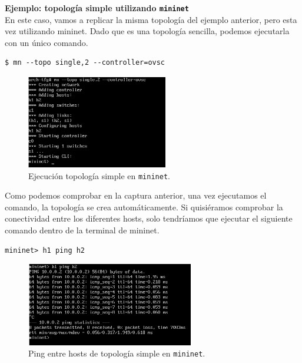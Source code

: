 \documentclass[12pt]{article}
\begin{document}
	\vspace{10px}
	
	\noindent \textbf{\large Ejemplo: topología simple utilizando \texttt{mininet}}\\
	
	\noindent En este caso, vamos a replicar la misma topología del ejemplo anterior, pero esta vez utilizando mininet. Dado que es una topología sencilla, podemos ejecutarla con un único comando. 
	
	\begin{verbatim}
$ mn --topo single,2 --controller=ovsc
	\end{verbatim}

	\begin{figure}[h!]
		\begin{center}
			\includegraphics[width=0.55\textwidth]{img/mn_single_1.png}
			\caption{Ejecución topología simple en \texttt{mininet}.}
		\end{center}
	\end{figure}

	\pagebreak
	
	\noindent Como podemos comprobar en la captura anterior, una vez ejecutamos el comando, la topología se crea automáticamente. Si quisiéramos comprobar la conectividad entre los diferentes hosts, solo tendríamos que ejecutar el siguiente comando dentro de la terminal de mininet.
	
	\begin{verbatim}
mininet> h1 ping h2
	\end{verbatim}

	\begin{figure}[h!]
		\begin{center}
			\includegraphics[width=0.65\textwidth]{img/mn_single_2.png}
			\caption{Ping entre hosts de topología simple en \texttt{mininet}.}
			\label{img: ping mn simple}
		\end{center}
	\end{figure}
\end{document}
